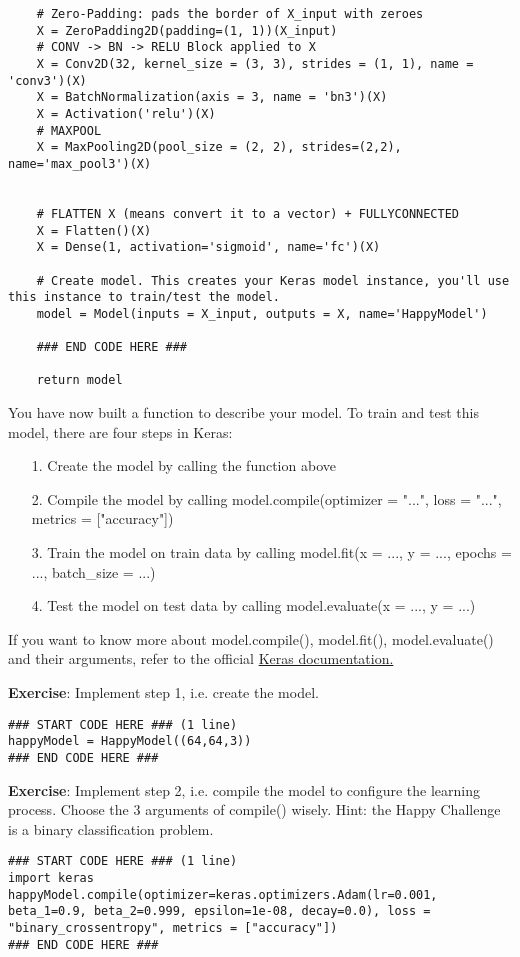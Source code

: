 \begin{verbatim}
    # Zero-Padding: pads the border of X_input with zeroes
    X = ZeroPadding2D(padding=(1, 1))(X_input)
    # CONV -> BN -> RELU Block applied to X
    X = Conv2D(32, kernel_size = (3, 3), strides = (1, 1), name = 'conv3')(X)
    X = BatchNormalization(axis = 3, name = 'bn3')(X)
    X = Activation('relu')(X)
    # MAXPOOL
    X = MaxPooling2D(pool_size = (2, 2), strides=(2,2), name='max_pool3')(X)
    

    # FLATTEN X (means convert it to a vector) + FULLYCONNECTED
    X = Flatten()(X)
    X = Dense(1, activation='sigmoid', name='fc')(X)

    # Create model. This creates your Keras model instance, you'll use this instance to train/test the model.
    model = Model(inputs = X_input, outputs = X, name='HappyModel')
    
    ### END CODE HERE ###
    
    return model
\end{verbatim}

You have now built a function to describe your model. To train and test this model, there are four steps in Keras:
\begin{itemize}
\item[1.] Create the model by calling the function above
\item[2.] Compile the model by calling model.compile(optimizer = "...", loss = "...", metrics = ["accuracy"])
\item[3.] Train the model on train data by calling model.fit(x = ..., y = ..., epochs = ..., batch\_size = ...)
\item[4.] Test the model on test data by calling model.evaluate(x = ..., y = ...)
\end{itemize}

If you want to know more about model.compile(), model.fit(), model.evaluate() and their arguments, refer to the official \href{https://keras.io/models/model/}{Keras documentation.}

{\textbf {Exercise}}: Implement step 1, i.e. create the model.

\begin{verbatim}
### START CODE HERE ### (1 line)
happyModel = HappyModel((64,64,3))
### END CODE HERE ###
\end{verbatim}


{\textbf {Exercise}}:  Implement step 2, i.e. compile the model to configure the learning process. Choose the 3 arguments of compile() wisely. Hint: the Happy Challenge is a binary classification problem.
\begin{verbatim}
### START CODE HERE ### (1 line)
import keras
happyModel.compile(optimizer=keras.optimizers.Adam(lr=0.001, beta_1=0.9, beta_2=0.999, epsilon=1e-08, decay=0.0), loss = "binary_crossentropy", metrics = ["accuracy"])
### END CODE HERE ###
\end{verbatim}

